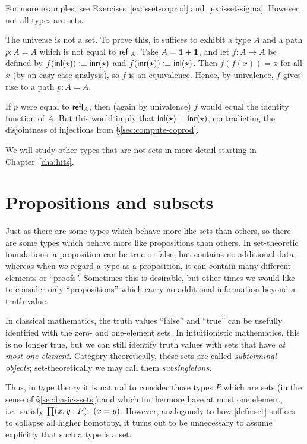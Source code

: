 For more examples, see Exercises~\ref{ex:isset-coprod} and~\ref{ex:isset-sigma}.
However, not all types are sets.

\begin{eg}
  The universe \type is not a set.
  To prove this, it suffices to exhibit a type $A$ and a path $p:A=A$ which is not equal to $\mathsf{refl}_{A}$.
  Take $A=\mathbf{1}+\mathbf{1}$, and let $f:A\to A$ be defined by $f(\mathsf{inl}(\star))\vcentcolon\equiv \mathsf{inr}(\star)$ and $f(\mathsf{inr}(\star))\vcentcolon\equiv \mathsf{inl}(\star)$.
  Then $f(f(x))=x$ for all $x$ (by an easy case analysis), so $f$ is an equivalence.
  Hence, by univalence, $f$ gives rise to a path $p:A=A$.

  If $p$ were equal to $\mathsf{refl}_{A}$, then (again by univalence) $f$ would equal the identity function of $A$.
  But this would imply that $\mathsf{inl}(\star)=\mathsf{inr}(\star)$, contradicting the disjointness of injections from \S\ref{sec:compute-coprod}.
\end{eg}

We will study other types that are not sets in more detail starting in Chapter~\ref{cha:hits}.


\section{Propositions and subsets}
\label{sec:prop-subset}

Just as there are some types which behave more like sets than others, so there are some types which behave more like propositions than others.
In set-theoretic foundations, a proposition can be true or false, but contains no additional data, whereas when we regard a type as a proposition, it can contain many different elements or ``proofs''.
Sometimes this is desirable, but other times we would like to consider only ``propositions'' which carry no additional information beyond a truth value.

In classical mathematics, the truth values ``false'' and ``true'' can be usefully identified with the zero- and one-element sets.
In intuitionistic mathematics, this is no longer true, but we can still identify truth values with sets that have \emph{at most one element}.
Category-theoretically, these sets are called \emph{subterminal objects}; set-theoretically we may call them \emph{subsingletons}.

Thus, in type theory it is natural to consider those types $P$ which are sets (in the sense of \S\ref{sec:basics-sets}) and which furthermore have at most one element, i.e.\ satisfy $\prd{x,y:P} (x=y)$.
However, analogously to how \autoref{defn:set} suffices to collapse all higher homotopy, it turns out to be unnecessary to assume explicitly that such a type is a set.

